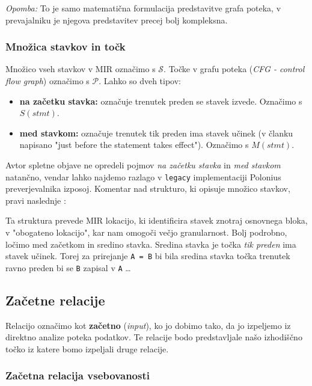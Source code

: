 \documentclass[a4paper,12pt,openright]{book}
\begin{document}
\textit{Opomba:} To je samo matematična formulacija predstavitve grafa poteka, v prevajalniku
je njegova predstavitev precej bolj kompleksna.

\subsubsection{Množica stavkov in točk}

Množico vseh stavkov v MIR označimo s $\mathcal{S}$. Točke v grafu poteka (\textit{CFG - control flow graph})
označimo s $\mathcal{P}$. Lahko so dveh tipov:
\begin{itemize}
	\item \textbf{na začetku stavka:} označuje trenutek preden se stavek izvede. Označimo s $S(stmt)$.
	\item \textbf{med stavkom:} označuje trenutek tik preden ima stavek učinek (v članku napisano "just before the statement takes effect").
	      Označimo s $M(stmt)$.
\end{itemize}

Avtor spletne objave ne opredeli pojmov \textit{na začetku stavka} in \textit{med stavkom} natančno,
vendar lahko najdemo razlago v \verb|legacy| implementaciji Polonius preverjevalnika izposoj.
Komentar nad strukturo, ki opisuje množico stavkov, pravi naslednje \cite{RustCompilerRustc_borrowcka}:

\begin{displayquote}
	Ta struktura prevede MIR lokacijo, ki identificira stavek znotraj osnovnega bloka, v "obogateno lokacijo",
	kar nam omogoči večjo granularnost. Bolj podrobno, ločimo med začetkom in sredino stavka. Sredina stavka
	je točka \textit{tik preden} ima stavek učinek. Torej za prirejanje \verb|A = B| bi bila sredina stavka
	točka trenutek ravno preden bi se \verb|B| zapisal v \verb|A| \dots
\end{displayquote}

\subsection{Začetne relacije}

Relacijo označimo kot \textbf{začetno} (\textit{input}), ko jo dobimo tako, da jo izpeljemo
iz direktno analize poteka podatkov. Te relacije bodo predstavljale našo izhodiščno točko iz katere bomo izpeljali druge relacije.


\subsubsection{Začetna relacija vsebovanosti}
\end{document}
